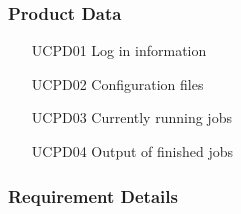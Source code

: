   \subsubsection{Product Data} 
  \begin{itemize}
    \item [UCPD01] Log in information
    \item [UCPD02] Configuration files
    \item [UCPD03] Currently running jobs
    \item [UCPD04] Output of finished jobs
  \end{itemize}

  \subsubsection{Requirement Details} 
